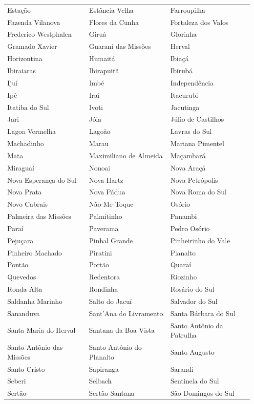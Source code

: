 \begin{longtable}{lll}
Estação & Estância Velha & Farroupilha \\
Fazenda Vilanova & Flores da Cunha & Fortaleza dos Valos \\
Frederico Westphalen & Giruá & Glorinha \\
Gramado Xavier & Guarani das Missões & Herval \\
Horizontina & Humaitá & Ibiaçá \\
Ibiraiaras & Ibirapuitã & Ibirubá \\
Ijuí & Imbé & Independência \\
Ipê & Iraí & Itacurubi \\
Itatiba do Sul & Ivoti & Jacutinga \\
Jari & Jóia & Júlio de Castilhos \\
Lagoa Vermelha & Lagoão & Lavras do Sul \\
Machadinho & Marau & Mariana Pimentel \\
Mata & Maximiliano de Almeida & Maçambará \\
Miraguaí & Nonoai & Nova Araçá \\
Nova Esperança do Sul & Nova Hartz & Nova Petrópolis \\
Nova Prata & Nova Pádua & Nova Roma do Sul \\
Novo Cabrais & Não-Me-Toque & Osório \\
Palmeira das Missões & Palmitinho & Panambi \\
Paraí & Paverama & Pedro Osório \\
Pejuçara & Pinhal Grande & Pinheirinho do Vale \\
Pinheiro Machado & Piratini & Planalto \\
Pontão & Portão & Quaraí \\
Quevedos & Redentora & Riozinho \\
Ronda Alta & Rondinha & Rosário do Sul \\
Saldanha Marinho & Salto do Jacuí & Salvador do Sul \\
Sananduva & Sant'Ana do Livramento & Santa Bárbara do Sul \\
Santa Maria do Herval & Santana da Boa Vista & Santo Antônio da Patrulha \\
Santo Antônio das Missões & Santo Antônio do Planalto & Santo Augusto \\
Santo Cristo & Sapiranga & Sarandi \\
Seberi & Selbach & Sentinela do Sul \\
Sertão & Sertão Santana & São Domingos do Sul \\

\end{longtable}
